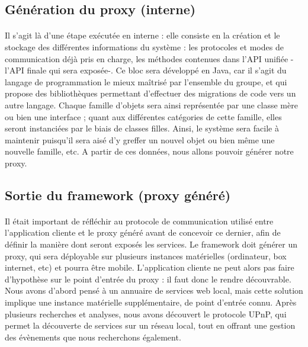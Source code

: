\documentclass[nocopyrightspace]{sigplanconf}
\begin{document}
	\subsection{Génération du proxy (interne)}
		\paragraph{}
		Il s’agit là d’une étape exécutée en interne : elle consiste en la création et le stockage des différentes informations du système : les protocoles et modes de communication déjà pris en charge, les méthodes contenues dans l’API unifiée -l’API finale qui sera exposée-. Ce bloc sera développé en Java, car il s’agit du langage de programmation le mieux maîtrisé par l’ensemble du groupe, et qui propose des bibliothèques permettant d’effectuer des migrations de code vers un autre langage. Chaque famille d’objets sera ainsi représentée par une classe mère ou bien une interface ; quant aux différentes catégories de cette famille, elles seront instanciées par le biais de classes filles. Ainsi, le système sera facile à maintenir puisqu’il sera aisé d’y greffer un nouvel objet ou bien même une nouvelle famille, etc. A partir de ces données, nous allons pouvoir générer notre proxy.

	\subsection{Sortie du framework (proxy généré)}
		\paragraph{}
		Il était important de réfléchir au protocole de communication utilisé entre l'application cliente et le proxy généré avant de concevoir ce dernier, afin de définir la manière dont seront exposés les services. Le framework doit générer un proxy, qui sera déployable sur plusieurs instances matérielles (ordinateur, box internet, etc) et pourra être mobile. L'application cliente ne peut alors pas faire d'hypothèse sur le point d'entrée du proxy : il faut donc le rendre découvrable. Nous avons d'abord pensé à un annuaire de services web local, mais cette solution implique une instance matérielle supplémentaire, de point d'entrée connu. Après plusieurs recherches et analyses, nous avons découvert le protocole UPnP, qui permet la découverte de services sur un réseau local, tout en offrant une gestion des évènements que nous recherchons également.
\end{document}
